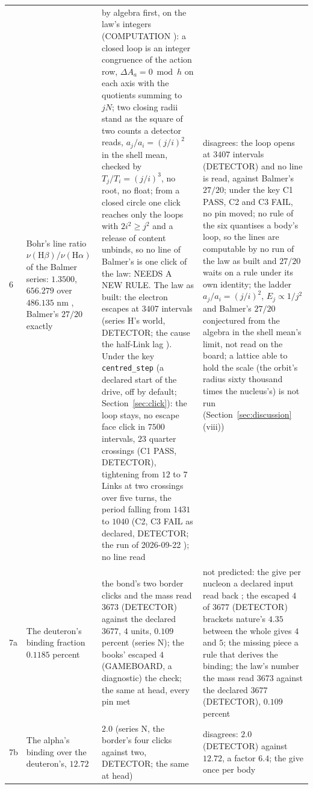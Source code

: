 {\begin{longtable}{L{0.3in}L{2.0in}L{1.5in}L{2.2in}}
6 & Bohr's line ratio $\nu(\mathrm{H}\beta)/\nu(\mathrm{H}\alpha)$ of the Balmer series: $1.3500$, $656.279$ over $486.135$ nm \cite{nist}, Balmer's $27/20$ exactly & by algebra first, on the law's integers (COMPUTATION \cite{atomalgebra}): a closed loop is an integer congruence of the action row, $\Delta A_a = 0 \bmod h$ on each axis with the quotients summing to $jN$; two closing radii stand as the square of two counts a detector reads, $a_j/a_i = (j/i)^2$ in the shell mean, checked by $T_j/T_i = (j/i)^3$, no root, no float; from a closed circle one click reaches only the loops with $2i^2 \ge j^2$ and a release of content unbinds, so no line of Balmer's is one click of the law: NEEDS A NEW RULE. The law as built: the electron escapes at $3407$ intervals (series H's world, DETECTOR; the cause the half-Link lag \cite{atomcause}). Under the key \texttt{centred\_step} (a declared start of the drive, off by default; Section~\ref{sec:click}): the loop stays, no escape face click in $7500$ intervals, $23$ quarter crossings (C1 PASS, DETECTOR), tightening from $12$ to $7$ Links at two crossings over five turns, the period falling from $1431$ to $1040$ (C2, C3 FAIL as declared, DETECTOR; the run of 2026-09-22 \cite{atomcentred}); no line read & disagrees: the loop opens at $3407$ intervals (DETECTOR) and no line is read, against Balmer's $27/20$; under the key C1 PASS, C2 and C3 FAIL, no pin moved; no rule of the six quantises a body's loop, so the lines are computable by no run of the law as built and $27/20$ waits on a rule under its own identity; the ladder $a_j/a_i = (j/i)^2$, $E_j \propto 1/j^2$ and Balmer's $27/20$ conjectured from the algebra in the shell mean's limit, not read on the board; a lattice able to hold the scale (the orbit's radius sixty thousand times the nucleus's) is not run (Section~\ref{sec:discussion} (viii)) \\
7a & The deuteron's binding fraction $0.1185$ percent \cite{ame2020} & the bond's two border clicks and the mass read $3673$ (DETECTOR) against the declared $3677$, $4$ units, $0.109$ percent (series N); the books' escaped $4$ (GAMEBOARD, a diagnostic) the check; the same at head, every pin met & not predicted: the give per nucleon a declared input read back \cite[record 106]{log}; the escaped $4$ of $3677$ (DETECTOR) brackets nature's $4.35$ between the whole gives $4$ and $5$; the missing piece a rule that derives the binding; the law's number the mass read $3673$ against the declared $3677$ (DETECTOR), $0.109$ percent \\
7b & The alpha's binding over the deuteron's, $12.72$ \cite{ame2020} & $2.0$ (series N, the border's four clicks against two, DETECTOR; the same at head) & disagrees: $2.0$ (DETECTOR) against $12.72$, a factor $6.4$; the give once per body \\

\end{longtable}}
